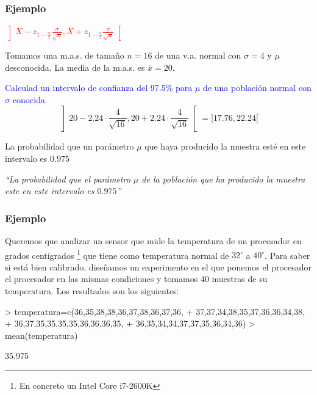 \documentclass[12pt,t]{beamer}
\newcommand{\red}[1]{\textcolor{red}{#1}}
\newcommand{\blue}[1]{\textcolor{blue}{#1}}
\renewcommand{\emph}[1]{{\color{red}#1}}
\theoremstyle{plain}
\theoremstyle{definition}
\begin{document}
\begin{frame}
\frametitle{Ejemplo}
\red{$\displaystyle
\left]\overline{X} -z_{1-\frac{\alpha}{2}} \frac{\sigma}{\sqrt{n}}, \overline{X}+z_{1-\frac{\alpha}{2}}\frac{\sigma}{\sqrt{n}}
\right[$}
\medskip


Tomamos una m.a.s. de  tamaño  $n=16$ de una v.a. normal con $\sigma=4$ y $\mu$ desconocida. La media   de la m.a.s. es
$\overline{x}=20$.
\medskip

\blue{Calculad un intervalo de confianza  del 97.5\%  para $\mu$ de  una población normal con $\sigma$ conocida}
$$
\left] 20-2.24\cdot \frac{4}{\sqrt{16}} ,
20+2.24\cdot \frac{4}{\sqrt{16}}
\right[
=]17.76,22.24[
$$

La probabilidad que un parámetro $\mu$ que haya producido la muestra esté en este intervalo  es $0.975$
\medskip

\textsl{``La probabilidad que el parámetro $\mu$  de la población que ha producido la muestra este  en este intervalo  es $0.975$''}


\end{frame}


\begin{frame}[fragile]
\frametitle{Ejemplo}
Queremos que analizar un sensor que mide la temperatura de un procesador en grados centígrados \footnote{En concreto un \emph{Intel Core i7-2600K}} que tiene 	como temperatura normal de  $32^{\circ}$ a $40^{\circ}$. Para saber si está bien calibrado, diseñamos un experimento en el que ponemos  el procesador el procesador en las mismas condiciones y  tomamos 40 muestras de su temperatura.
Los resultados son los siguientes:

\begin{Schunk}
\begin{Sinput}
> temperatura=c(36,35,38,38,36,37,38,36,37,36,
+               37,37,34,38,35,37,36,36,34,38,
+               36,37,35,35,35,35,36,36,36,35,
+               36,35,34,34,37,37,35,36,34,36)
> mean(temperatura)
\end{Sinput}
\begin{Soutput}
[1] 35.975
\end{Soutput}
\end{Schunk}

\end{frame}
\end{document}
